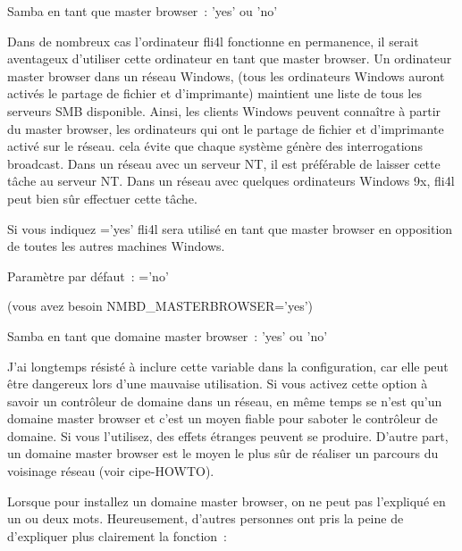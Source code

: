\begin{description}

    Samba en tant que master browser~: 'yes' ou 'no'

    Dans de nombreux cas l'ordinateur fli4l fonctionne en permanence, il
    serait aventageux d'utiliser cette ordinateur en tant que master browser.
    Un ordinateur master browser dans un réseau Windows, (tous les ordinateurs
    Windows auront activés le partage de fichier et d'imprimante) maintient une
    liste de tous les serveurs SMB disponible. Ainsi, les clients Windows peuvent
    connaître à partir du master browser, les ordinateurs qui ont le partage de
    fichier et d'imprimante activé sur le réseau. cela évite que chaque système
    génère des interrogations broadcast. Dans un réseau avec un serveur NT,
    il est préférable de laisser cette tâche au serveur NT. Dans un réseau avec
    quelques ordinateurs Windows 9x, fli4l peut bien sûr effectuer cette tâche.

    Si vous indiquez ='yes' fli4l sera utilisé
    en tant que master browser en opposition de toutes les autres machines Windows.

    Paramètre par défaut~: ='no'


 (vous avez besoin NMBD\_MASTERBROWSER='yes')

    Samba en tant que domaine master browser~: 'yes' ou 'no'

    J'ai longtemps résisté à inclure cette variable dans la configuration, car
    elle peut être dangereux lors d'une mauvaise utilisation. Si vous activez
    cette option à savoir un contrôleur de domaine dans un réseau, en même temps
    se n'est qu'un domaine master browser et c'est un moyen fiable pour saboter
    le contrôleur de domaine. Si vous l'utilisez, des effets étranges peuvent se
    produire. D'autre part, un domaine master browser est le moyen le plus sûr
    de réaliser un parcours du voisinage réseau (voir cipe-HOWTO).

    Lorsque pour installez un domaine master browser, on ne peut pas l'expliqué
    en un ou deux mots. Heureusement, d'autres personnes ont pris la peine de
    d'expliquer plus clairement la fonction~:



\end{description}
